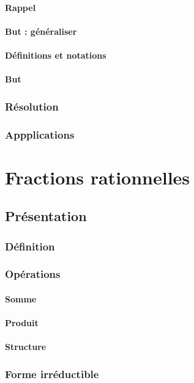 \documentclass[12pt,a4paper,french]{book}
\begin{document}
			\subsubsection{Rappel}
			\subsubsection{But : généraliser}
			\subsubsection{Définitions et notations}
			\subsubsection{But}
		\subsection{Résolution}
		\subsection{Appplications}
		
\chapter{Fractions rationnelles}
	\section{Présentation}
		\subsection{Définition}
		\subsection{Opérations}
			\subsubsection{Somme}
			\subsubsection{Produit}
			\subsubsection{Structure}
		\subsection{Forme irréductible}
\end{document}

